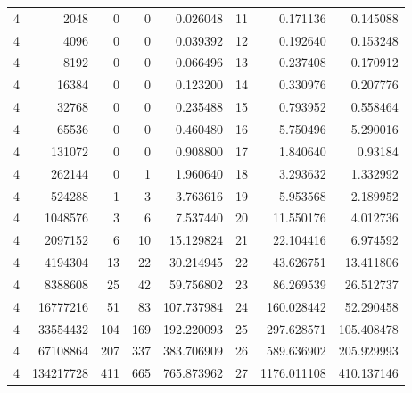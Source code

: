 \begin{longtable}[c]{@{}rrrrrrrr@{}}
    4         & 2048      & 0         & 0        & 0.026048    & 11                  & 0.171136    & 0.145088   \\
    4         & 4096      & 0         & 0        & 0.039392    & 12                  & 0.192640    & 0.153248   \\
    4         & 8192      & 0         & 0        & 0.066496    & 13                  & 0.237408    & 0.170912   \\
    4         & 16384     & 0         & 0        & 0.123200    & 14                  & 0.330976    & 0.207776   \\
    4         & 32768     & 0         & 0        & 0.235488    & 15                  & 0.793952    & 0.558464   \\
    4         & 65536     & 0         & 0        & 0.460480    & 16                  & 5.750496    & 5.290016   \\
    4         & 131072    & 0         & 0        & 0.908800    & 17                  & 1.840640    & 0.93184    \\
    4         & 262144    & 0         & 1        & 1.960640    & 18                  & 3.293632    & 1.332992   \\
    4         & 524288    & 1         & 3        & 3.763616    & 19                  & 5.953568    & 2.189952   \\
    4         & 1048576   & 3         & 6        & 7.537440    & 20                  & 11.550176   & 4.012736   \\
    4         & 2097152   & 6         & 10       & 15.129824   & 21                  & 22.104416   & 6.974592   \\
    4         & 4194304   & 13        & 22       & 30.214945   & 22                  & 43.626751   & 13.411806  \\
    4         & 8388608   & 25        & 42       & 59.756802   & 23                  & 86.269539   & 26.512737  \\
    4         & 16777216  & 51        & 83       & 107.737984  & 24                  & 160.028442  & 52.290458  \\
    4         & 33554432  & 104       & 169      & 192.220093  & 25                  & 297.628571  & 105.408478 \\
    4         & 67108864  & 207       & 337      & 383.706909  & 26                  & 589.636902  & 205.929993 \\
    4         & 134217728 & 411       & 665      & 765.873962  & 27                  & 1176.011108 & 410.137146 \\

\end{longtable}
